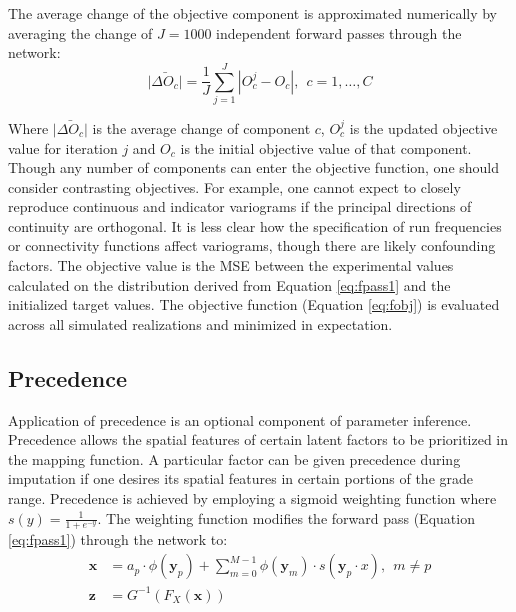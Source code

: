 The average change of the objective component is approximated numerically by averaging the change of $J=1000$ independent forward passes through the network:
\begin{equation}
    \bar{|\Delta O_{c}|} = \frac{1}{J} \sum_{j=1}^{J} | O^{j}_{c} - O_{c}|, \ \ c=1,\dots, C
    \label{eq:fobj_avg}
\end{equation}

Where $\bar{|\Delta O_{c}|}$ is the average change of component $c$, $O^{j}_{c}$ is the updated objective value for iteration $j$ and $O_{c}$ is the initial objective value of that component. Though any number of components can enter the objective function, one should consider contrasting objectives. For example, one cannot expect to closely reproduce continuous and indicator variograms if the principal directions of continuity are orthogonal. It is less clear how the specification of run frequencies or connectivity functions affect variograms, though there are likely confounding factors. The objective value is the \gls{MSE} between the experimental values calculated on the distribution derived from Equation \ref{eq:fpass1} and the initialized target values. The objective function (Equation \ref{eq:fobj}) is evaluated across all simulated realizations and minimized in expectation.

\subsection{Precedence}
\label{subsec:04precedence}

Application of precedence is an optional component of parameter inference. Precedence allows the spatial features of certain latent factors to be prioritized in the mapping function. A particular factor can be given precedence during imputation if one desires its spatial features in certain portions of the grade range. Precedence is achieved by employing a sigmoid weighting function where $s(y) = \frac{1}{1+e^{-y}}$. The weighting function modifies the forward pass (Equation \ref{eq:fpass1}) through the network to:
\begin{align}
    \label{eq:wtpass1}
    \mathbf{x} & = a_{p} \cdot \phi(\mathbf{y}_{p}) + \sum_{m=0}^{M-1} \phi(\mathbf{y}_{m}) \cdot s(\mathbf{y}_{p} \cdot x), \ \ m \neq p \\
    \label{eq:wtpass2}
    \mathbf{z} & = G^{-1}\left( F_{X}\left(\mathbf{x} \right)\right)
\end{align}

